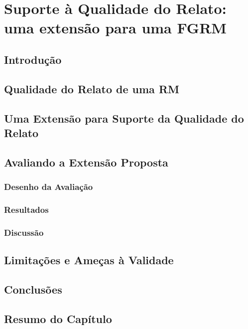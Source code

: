 \chapter{Suporte à Qualidade do Relato: uma extensão para uma FGRM}
\label{ch:implemtacao_extensao}

\section{Introdução}
\label{sec:implemtacao_extensao_intro}

\section{Qualidade do Relato de uma RM}
\label{sec:avaliando_a_qualidade_do_relato_de_uma_rm}

\section{Uma Extensão para Suporte da Qualidade do Relato}
\label{sec:uma_extensao_suporte_qualidade_relato}

\section{Avaliando a Extensão Proposta}
\label{sec:avaliando_a_extensao_proposta}

\subsection{Desenho da Avaliação}
\label{sub:implementacao_extenscao_desenho_da_avaliacao}

\subsection{Resultados}
\label{sub:implementacao_extensao_avaliacao_resultados}

\subsection{Discussão}
\label{sub:implemtacao_extensao_avaliacao_discussao}

\section{Limitações e Ameças à Validade}
\label{sec:limitações_e_ameças_à_validade}

\section{Conclusões}
\label{sec:conclusões}

\section{Resumo do Capítulo}
\label{sec:implemtacao_extensao_resumo}
